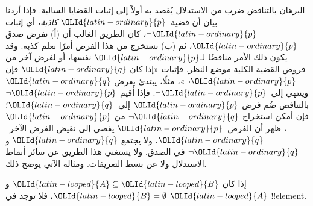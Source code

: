 \documentclass[../../../include/open-logic-section]{subfiles}
\begin{document}


البرهان بالتناقض ضرب من الاستدلال يُقصد به أولاً إلى إثبات القضايا
السالبة. فإذا أردنا بيان أن قضية~$\OLId{latin-ordinary}{p}$ \emph{كاذبة}، أي إثبات
$\lnot \OLId{latin-ordinary}{p}$، كان الطريق الغالب أن (أ) نفرض صدق $\OLId{latin-ordinary}{p}$، ثم (ب) نستخرج من
هذا الفرض أمرًا نعلم كذبه. وقد يكون ذلك الأمر مناقضًا لـ$\OLId{latin-ordinary}{p}$ نفسها، أو
لفرض آخر من فروض القضية الكلية موضع النظر. فإثبات «إذا كان $\OLId{latin-ordinary}{q}$ فإن
$\lnot \OLId{latin-ordinary}{p}$»، مثلًا، يبتدئ بفرض $\OLId{latin-ordinary}{q}$ وينتهي إلى~$\lnot \OLId{latin-ordinary}{p}$. فإذا أُقيم
$\lnot \OLId{latin-ordinary}{p}$ بالتناقض ضُم فرض $\OLId{latin-ordinary}{p}$ إلى~$\OLId{latin-ordinary}{q}$؛ فإن أمكن استخراج $\lnot \OLId{latin-ordinary}{q}$
من $\OLId{latin-ordinary}{p}$، ظهر أن الفرض~$\OLId{latin-ordinary}{p}$ يفضي إلى نقيض الفرض الآخر~$\OLId{latin-ordinary}{q}$، ولا يجتمع
$\OLId{latin-ordinary}{q}$ و$\lnot \OLId{latin-ordinary}{q}$ في الصدق. ولا يستغني هذا الطريق عن سائر أنماط
الاستدلال ولا عن بسط التعريفات. ومثاله الآتي يوضح ذلك.

\begin{prop}
  إذا كان $\OLId{latin-looped}{A} \subseteq \OLId{latin-looped}{B}$ و$\OLId{latin-looped}{B} = \emptyset$، فلا توجد في $\OLId{latin-looped}{A}$
  !!{element}.
\end{prop}
\end{document}
